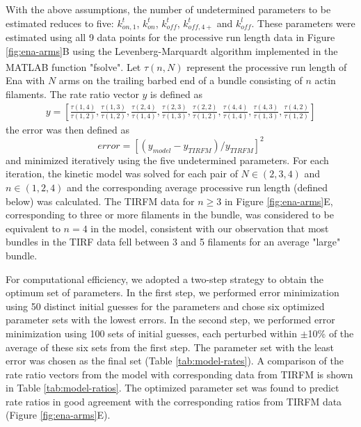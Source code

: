 With the above assumptions, the number of undetermined parameters to be estimated reduces to five: $k_{on,1}^{t}$, $k_{on}^{t}$, $k_{off}^{t}$, $k_{off,4+}^{t}$ and $k_{off}^{l}$. These parameters were estimated using all 9 data points for the processive run length data in Figure \ref{fig:ena-arms}B using the Levenberg-Marquardt algorithm implemented in the MATLAB\textsuperscript{\textregistered} function "fsolve". Let $\tau(n,N)$ represent the processive run length of Ena with $N$ arms on the trailing barbed end of a bundle consisting of $n$ actin filaments. The rate ratio vector $y$ is defined as
\begin{equation}\label{eqn:ratio-vector}
\begin{split}
y = [\frac{\tau(1,4)}{\tau(1,2)}, \frac{\tau(1,3)}{\tau(1,2)}, \frac{\tau(2,4)}{\tau(1,4)}, \frac{\tau(2,3)}{\tau(1,3)}, \frac{\tau(2,2)}{\tau(1,2)}, 
 \frac{\tau(4,4)}{\tau(1,4)}, \frac{\tau(4,3)}{\tau(1,3)}, \frac{\tau(4,2)}{\tau(1,2)}] 
\end{split}
\end{equation}
the error was then defined as
\begin{equation}\label{eqn:error}
error=[(y_{model}-y_{TIRFM})/y_{TIRFM}]^{2}
\end{equation}
and minimized iteratively using the five undetermined parameters. For each iteration, the kinetic model was solved for each pair of $N\in(2,3,4)$ and $n\in(1,2,4)$ and the corresponding average processive run length (defined below) was calculated. The TIRFM data for $n\geq 3$ in Figure \ref{fig:ena-arms}E, corresponding to three or more filaments in the bundle, was considered to be equivalent to $n=4$ in the model, consistent with our observation that most bundles in the TIRF data fell between 3 and 5 filaments for an average "large" bundle.

For computational efficiency, we adopted a two-step strategy to obtain the optimum set of parameters. In the first step, we performed error minimization using 50 distinct initial guesses for the parameters and chose six optimized parameter sets with the lowest errors. In the second step, we performed error minimization using 100 sets of initial guesses, each perturbed within $\pm$10\% of the average of these six sets from the first step. The parameter set with the least error was chosen as the final set (Table \ref{tab:model-rates}). A comparison of the rate ratio vectors from the model with corresponding data from TIRFM is shown in Table \ref{tab:model-ratios}. The optimized parameter set was found to predict rate ratios in good agreement with the corresponding ratios from TIRFM data (Figure \ref{fig:ena-arms}E).

